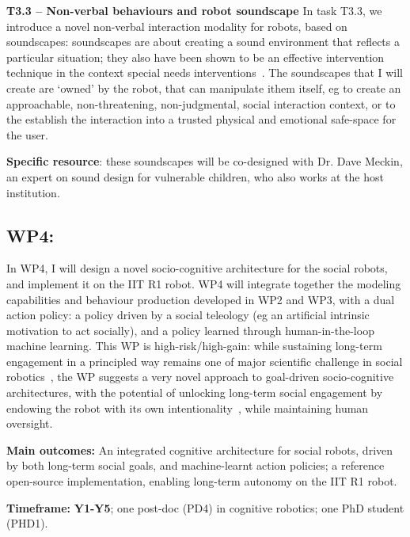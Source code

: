 \textbf{T3.3 -- Non-verbal behaviours and robot soundscape} In task T3.3, we
introduce a novel non-verbal interaction modality for robots, based on
soundscapes: soundscapes are about creating a sound environment that reflects a
particular situation; they also have been shown to be an effective intervention
technique in the context special needs
interventions~\cite{greher2010soundscape}. The soundscapes that I will create
are `owned' by the robot, that can manipulate ithem itself, eg to create an
approachable, non-threatening, non-judgmental, social interaction context, or to
the establish the interaction into a trusted physical and emotional safe-space
for the user.

\textbf{Specific resource}: these soundscapes will be co-designed with Dr.
Dave Meckin, an expert on sound design for vulnerable children, who also works
at the host institution.

\subsection{WP4: \textbf{\wpFour}}

In WP4, I will design a novel socio-cognitive architecture for the social
robots, and implement it on the IIT R1 robot.  WP4 will integrate together the
modeling capabilities and behaviour production developed in WP2 and WP3, with a
dual action policy: a policy driven by a social teleology (eg an artificial
intrinsic motivation to act socially), and a policy learned through
human-in-the-loop machine learning. This WP is high-risk/high-gain: while sustaining
long-term engagement in a principled way remains one of major scientific
challenge in social robotics~\cite{hoffman2019anki}, the WP suggests a very novel
approach to goal-driven socio-cognitive architectures, with the potential of
unlocking long-term social engagement by endowing the robot with its own
intentionality~\cite{wiese2017robots}, while maintaining human oversight.

\begin{oframed}
    \textbf{Main outcomes:} An integrated cognitive architecture for social
    robots, driven by both long-term social goals, and machine-learnt action
    policies; a reference open-source implementation, enabling long-term
    autonomy on the IIT R1 robot.

    \textbf{Timeframe:} \textbf{Y1-Y5}; one post-doc (PD4) in cognitive
    robotics; one PhD student (PHD1).

\end{oframed}

